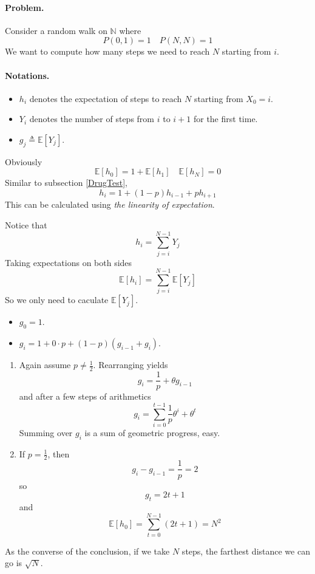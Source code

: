    \paragraph*{Problem.} Consider a random walk on $\mathbb{N}$ where
    \[ P(0,1) = 1 \quad P(N,N) = 1 \]
    We want to compute how many steps we need to reach $N$ starting from $i$.
    \paragraph*{Notations.}
    \begin{itemize}
        \item $h_i$ denotes the expectation of steps to reach $N$ starting from $X_0=i$.
        \item $Y_i$ denotes the number of steps from $i$ to $i+1$ for the first time.
        \item $g_j \triangleq \mathbb{E}[Y_j]$.
    \end{itemize}
    Obviously
    \[ \mathbb{E}[h_0] = 1 + \mathbb{E}[h_1] \quad \mathbb{E}[h_N] = 0 \]
    Similar to subsection \ref{DrugTest},
    \[ h_i = 1+ (1-p)h_{i-1} + ph_{i+1} \]
    This can be calculated using \emph{the linearity of expectation}. 

    Notice that
    \[ h_i = \sum_{j=i}^{N-1}Y_j \]
    Taking expectations on both sides
    \[ \mathbb{E}[h_i] = \sum_{j=i}^{N-1}\mathbb{E}[Y_j] \]
    So we only need to caculate $\mathbb{E}[Y_j]$.
    \begin{itemize}
        \item $g_0 = 1$.
        \item $g_i = 1 + 0 \cdot p + (1-p)(g_{i-1}+g_i)$.
    \end{itemize}
    \begin{enumerate}
        \item Again assume $p \neq \frac{1}{2}$. 
        Rearranging yields
        \[ g_i = \frac{1}{p} + \theta g_{i-1} \]
        and after a few steps of arithmetics
        \[ g_i = \sum_{i=0}^{t-1}\frac{1}{p}\theta^i + \theta^t \]
        Summing over $g_i$ is a sum of geometric progress, easy.
        \item If $p = \frac{1}{2}$, then
        \[ g_{i} - g_{i-1} = \frac{1}{p} = 2 \]
        so
        \[ g_t = 2t + 1 \]
        and
        \[ \mathbb{E}[h_0] = \sum_{t=0}^{N-1}(2t+1) = N^2 \]
    \end{enumerate}
    \begin{remark}
        As the converse of the conclusion, if we take $N$ steps, the farthest distance we can go is $\sqrt{N}$.
    \end{remark}




